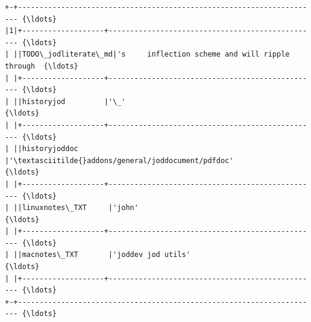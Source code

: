 \documentclass[11pt,letter,landscape]{article}
\begin{document}
    \begin{Verbatim}[commandchars=\\\{\}]
+-+---------------------------------------------------------------------- {\ldots}
|1|+-------------------+------------------------------------------------- {\ldots}
| ||TODO\_jodliterate\_md|'s     inflection scheme and will ripple through  {\ldots}
| |+-------------------+------------------------------------------------- {\ldots}
| ||historyjod         |'\_'                                               {\ldots}
| |+-------------------+------------------------------------------------- {\ldots}
| ||historyjoddoc      |'\textasciitilde{}addons/general/joddocument/pdfdoc'              {\ldots}
| |+-------------------+------------------------------------------------- {\ldots}
| ||linuxnotes\_TXT     |'john'                                            {\ldots}
| |+-------------------+------------------------------------------------- {\ldots}
| ||macnotes\_TXT       |'joddev jod utils'                                {\ldots}
| |+-------------------+------------------------------------------------- {\ldots}
+-+---------------------------------------------------------------------- {\ldots}
    \end{Verbatim}


    
    
    
\end{document}
